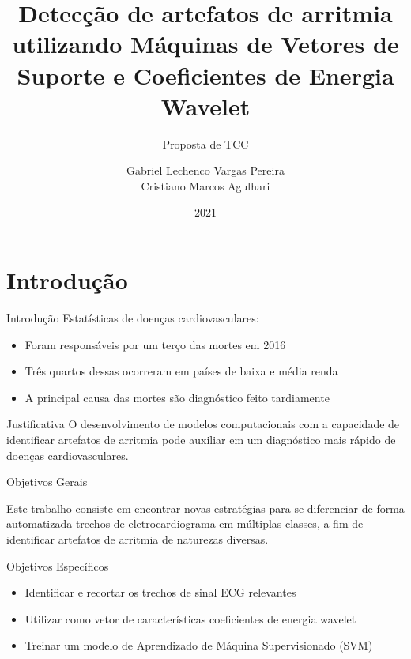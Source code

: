 \documentclass[10pt]{beamer}
\title{Detecção de artefatos de arritmia utilizando Máquinas de Vetores de Suporte e Coeficientes de Energia Wavelet}
\subtitle{Proposta de TCC}
\date{2021}
\author{Gabriel Lechenco Vargas Pereira \\
Cristiano Marcos Agulhari}
\institute{Universidade Tecnológica Federal do Paraná - UTFPR}
\begin{document}

\maketitle


\section{Introdução}

\begin{frame}{Introdução}
    Estatísticas de doenças cardiovasculares: \cite{who_cardiovascular_2017}
    \begin{itemize}
        \item Foram responsáveis por um terço das mortes em 2016 
        \item Três quartos dessas ocorreram em países de baixa e média renda
        \item A principal causa das mortes são diagnóstico feito tardiamente 
    \end{itemize}
\end{frame}

\begin{frame} {Justificativa}
  O desenvolvimento de modelos computacionais com a capacidade de identificar 
  artefatos de arritmia pode auxiliar em um diagnóstico mais rápido de doenças 
  cardiovasculares.
\end{frame}

\begin{frame}{Objetivos Gerais}

  Este trabalho consiste em encontrar novas estratégias para 
  se diferenciar de forma automatizada trechos de eletrocardiograma em múltiplas 
  classes, a fim de identificar artefatos  de  arritmia  de  naturezas  diversas.

\end{frame}

\begin{frame}{Objetivos Específicos}

  \begin{itemize}
    \item Identificar e recortar os trechos de sinal ECG relevantes
    \item Utilizar como vetor de características coeficientes de energia wavelet
    \item Treinar um modelo de Aprendizado de Máquina Supervisionado (SVM)
  \end{itemize}
\end{frame}
\end{document}
